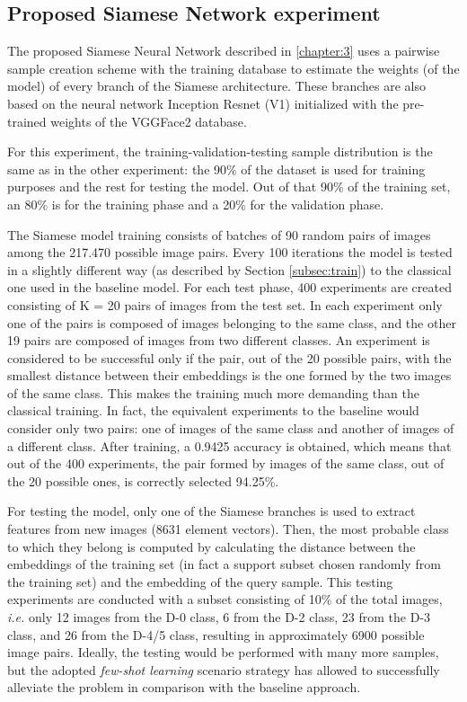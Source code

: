 \subsection{Proposed Siamese Network experiment}
\label{subsec:siameseExp}

The proposed Siamese Neural Network described in \ref{chapter:3} uses a pairwise sample creation scheme with the training database to estimate the weights (of the model) of every branch of the Siamese architecture. These branches are also based on the neural network Inception Resnet (V1) initialized with the pre-trained weights of the VGGFace2 database.

For this experiment, the training-validation-testing sample distribution is the same as in the other experiment: the 90\% of the dataset is used for training purposes and the rest for testing the model. Out of that 90\% of the training set, an 80\% is for the training phase and a 20\% for the validation phase.

The Siamese model training consists of batches of 90 random pairs of images among the 217.470 possible image pairs. Every 100 iterations the model is tested in a slightly different way (as described by Section \ref{subsec:train}) to the classical one used in the baseline model. For each test phase, 400 experiments are created consisting of K = 20 pairs of images from the test set. In each experiment only one of the pairs is composed of images belonging to the same class, and the other 19 pairs are composed of images from two different classes. An experiment is considered to be successful only if the pair, out of the 20 possible pairs, with the smallest distance between their embeddings is the one formed by the two images of the same class. This makes the training much more demanding than the classical training. In fact, the equivalent experiments to the baseline would consider only two pairs: one of images of the same class and another of images of a different class. After training, a 0.9425 accuracy is obtained, which means that out of the 400 experiments, the pair formed by images of the same class, out of the 20 possible ones, is correctly selected  94.25\%.

For testing the model, only one of the Siamese branches is used to extract features from new images (8631 element vectors). Then, the most probable class to which they belong is computed by calculating the distance between the embeddings of the training set (in fact a support subset chosen randomly from the training set) and the embedding of the query sample. This testing experiments are conducted with a subset consisting of 10\% of the total images, \emph{i.e.} only 12 images from the D-0 class, 6 from the D-2 class, 23 from the D-3 class, and 26 from the D-4/5 class, resulting in approximately 6900 possible image pairs. Ideally, the testing would be performed with many more samples, but the adopted \emph{few-shot learning} scenario strategy has allowed to successfully alleviate the problem in comparison with the baseline approach.

